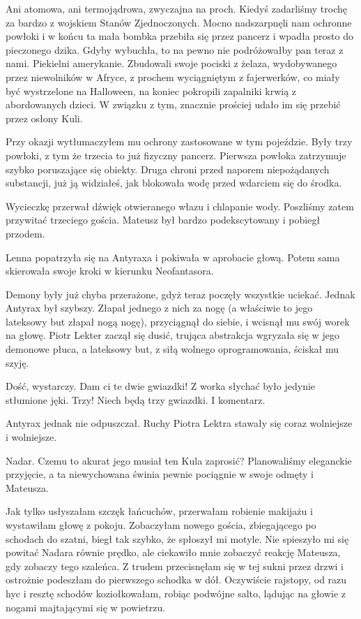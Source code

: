 

Ani atomowa, ani termojądrowa, zwyczajna na proch. Kiedyś zadarliśmy trochę za bardzo z wojskiem Stanów Zjednoczonych. 
Mocno nadszarpnęli nam ochronne powłoki i w końcu ta mała bombka przebiła się przez pancerz i wpadła prosto do pieczonego dzika.
Gdyby wybuchła, to na pewno nie podróżowałby pan teraz z nami.
Piekielni amerykanie. Zbudowali swoje pociski z żelaza, wydobywanego przez niewolników w Afryce,
z prochem wyciągniętym z fajerwerków, co miały być wystrzelone na Halloween, na koniec pokropili zapalniki krwią z abordowanych dzieci.
W związku z tym, znacznie prościej udało im się przebić przez osłony Kuli.

Przy okazji wytłumaczyłem mu ochrony zastosowane w tym pojeździe. Były trzy powłoki, z tym że trzecia to już fizyczny pancerz. 
Pierwsza powłoka zatrzymuje szybko poruszające się obiekty.
Druga chroni przed naporem niepożądanych substancji, już ją widziałeś, jak blokowała wodę przed wdarciem się do środka.

Wycieczkę przerwał dźwięk otwieranego włazu i chlapanie wody.
Poszliśmy zatem przywitać trzeciego gościa. Mateusz był bardzo podekscytowany i pobiegł przodem.

\divider{}

Lenna popatrzyła się na Antyraxa i pokiwała w aprobacie głową.
Potem sama skierowała swoje kroki w kierunku Neofantasora.

Demony były już chyba przerażone, gdyż teraz poczęły wszystkie uciekać.
Jednak Antyrax był szybszy. Złapał jednego z nich za nogę (a właściwie to jego lateksowy but złapał nogą nogę), przyciągnął do siebie, i wcisnął mu swój worek na głowę.
Piotr Lekter zaczął się dusić, trująca abstrakcja wgryzała się w jego demonowe płuca, a lateksowy but, z siłą wolnego oprogramowania, ściskał mu szyję.

\ds{} Dość, wystarczy. Dam ci te dwie gwiazdki! \dm{} Z worka słychać było jedynie stłumione jęki. \dm{} Trzy! Niech będą trzy gwiazdki. I komentarz. \de{}

Antyrax jednak nie odpuszczał. Ruchy Piotra Lektra stawały się coraz wolniejsze i wolniejsze.

\divider{}

Nadar. Czemu to akurat jego musiał ten Kula zaprosić?
Planowaliśmy eleganckie przyjęcie, a ta niewychowana świnia pewnie pociągnie w swoje odmęty i Mateusza.

Jak tylko usłyszałam szczęk łańcuchów, przerwałam robienie makijażu i wystawiłam głowę z pokoju.
Zobaczyłam nowego gościa, zbiegającego po schodach do szatni, biegł tak szybko, że spłoszył mi motyle.
Nie spieszyło mi się powitać Nadara równie prędko, ale ciekawiło mnie zobaczyć reakcję Mateusza, gdy zobaczy tego szaleńca.
Z trudem przecisnęłam się w tej sukni przez drzwi i ostrożnie podeszłam do pierwszego schodka w dół.
Oczywiście rajstopy, od razu hyc i resztę schodów koziołkowałam, robiąc podwójne salto, lądując na głowie z nogami majtającymi się w powietrzu.

